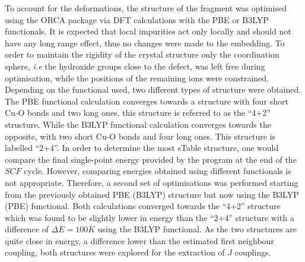 \documentclass[10pt]{report}
\numberwithin{equation}{section}
\begin{document}
To account for the deformations, the structure of the fragment was optimised using the ORCA package via DFT calculations with the PBE or B3LYP functionals.
It is expected that local impurities act only locally and should not have any long range effect, thus no changes were made to the embedding.
To order to maintain the rigidity of the crystal structure only the coordination sphere, \textit{i.e} the hydroxide groups close to the defect, was left free during optimisation, while the positions of the remaining ions were constrained.
Depending on the functional used, two different types of structure were obtained.
The PBE functional calculation converges towards a structure with four short Cu-O bonds and two long ones, this structure is referred to as the ``4+2'' structure.
While the B3LYP functional calculation converges towards the opposite, with two short Cu-O bonds and four long ones. This structure is labelled ``2+4''.
In order to determine the most sTable structure, one would compare the final single-point energy provided by the program at the end of the $SCF$ cycle. However, comparing energies obtained using different functionals is not appropriate.
Therefore, a second set of optimisations was performed starting from the previously obtained PBE (B3LYP) structure but now using the B3LYP (PBE) functional.
Both calculations converged towards the ``4+2'' structure which was found to be slightly lower in energy than the ``2+4'' structure with a difference of $\Delta E=100 K$ using the B3LYP functional.
As the two structures are quite close in energy, a difference lower than the estimated first neighbour coupling, both structures were explored for the extraction of $J$ couplings.
\end{document}
